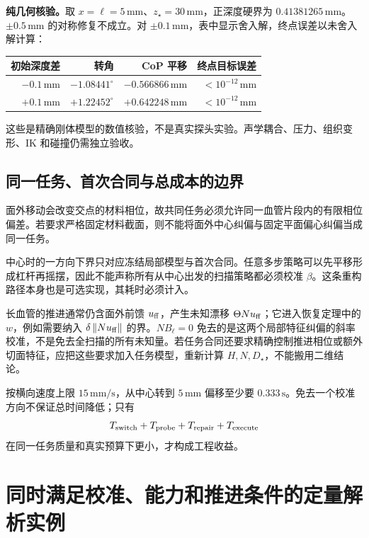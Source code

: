 \documentclass[11pt,a4paper]{article}
\numberwithin{equation}{section}
\theoremstyle{definition}
\newcommand{\norm}[1]{\left\lVert#1\right\rVert}
\begin{document}
\noindent\textbf{纯几何核验。}取 $x=\ell=5\,\mathrm{mm}$、$z_\star=30\,\mathrm{mm}$，正深度硬界为 $0.41381265\,\mathrm{mm}$。$\pm0.5\,\mathrm{mm}$ 的对称修复不成立。对 $\pm0.1\,\mathrm{mm}$，表中显示舍入解，终点误差以未舍入解计算：
\begin{center}
\begin{tabular}{rrrr}
\toprule
初始深度差 & 转角 & CoP 平移 & 终点目标误差\\
\midrule
$-0.1\,\mathrm{mm}$ & $-1.08441^\circ$ & $-0.566866\,\mathrm{mm}$ & $<10^{-12}\,\mathrm{mm}$\\
$+0.1\,\mathrm{mm}$ & $+1.22452^\circ$ & $+0.642248\,\mathrm{mm}$ & $<10^{-12}\,\mathrm{mm}$\\
\bottomrule
\end{tabular}
\end{center}
这些是精确刚体模型的数值核验，不是真实探头实验。声学耦合、压力、组织变形、IK 和碰撞仍需独立验收。

\subsection{同一任务、首次合同与总成本的边界}
面外移动会改变交点的材料相位，故共同任务必须允许同一血管片段内的有限相位偏差。若要求严格固定材料截面，则不能将面外中心纠偏与固定平面偏心纠偏当成同一任务。

中心时的一方向下界只对应冻结局部模型与首次合同。任意多步策略可以先平移形成杠杆再摇摆，因此不能声称所有从中心出发的扫描策略都必须校准 $\beta$。这条重构路径本身也是可选实现，其耗时必须计入。

长血管的推进通常仍含面外前馈 $u_{\rm ff}$，产生未知漂移 $\Theta Nu_{\rm ff}$；它进入恢复定理中的 $w$，例如需要纳入 $\delta\norm{Nu_{\rm ff}}$ 的界。$NB_\ell=0$ 免去的是这两个局部特征纠偏的斜率校准，不是免去全扫描的所有未知量。若任务合同还要求精确控制推进相位或额外切面特征，应把这些要求加入任务模型，重新计算 $H,N,D_\star$，不能搬用二维结论。

按横向速度上限 $15\,\mathrm{mm/s}$，从中心转到 $5\,\mathrm{mm}$ 偏移至少要 $0.333\,\mathrm{s}$。免去一个校准方向不保证总时间降低；只有
\begin{equation}
 T_{\rm switch}+T_{\rm probe}+T_{\rm repair}+T_{\rm execute}
\end{equation}
在同一任务质量和真实预算下更小，才构成工程收益。





\section{同时满足校准、能力和推进条件的定量解析实例}
\label{rev:quantitative-example}
\end{document}
